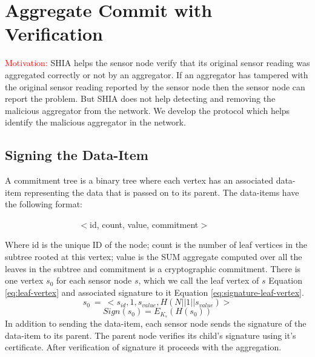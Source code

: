\chapter{Aggregate Commit with Verification} %
\label{cha:A Protocol for Commitment Tree Generation}
	
	\textcolor{red}{Motivation:}
	SHIA helps the sensor node verify that its original sensor reading was aggregated correctly or not by an aggregator.
	If an aggregator has tampered with the original sensor reading reported by the sensor node then the sensor node can report the problem.
	But SHIA does not help detecting and removing the malicious aggregator from the network.
	We develop the protocol which helps identify the malicious aggregator in the network.
	
\section{Signing the Data-Item}
	\begin{definition}
		\label{def:data-item}
		A commitment tree is a binary tree where each vertex has an associated data-item representing the data that is passed on to its parent. The data-items have the following format:

		$\hspace{100pt}$ $<$id, count, value, commitment$>$
	\end{definition}
	Where id is the unique ID of the node; count is the number of leaf vertices in the subtree rooted at this vertex; value is the SUM aggregate computed over all the leaves in the subtree and commitment is a cryptographic commitment.
	There is one vertex $s_{0}$ for each sensor node $s$, which we call the leaf vertex of $s$ Equation \ref{eq:leaf-vertex} and associated signature to it Equation \ref{eq:signature-leaf-vertex}.
	\begin{equation}
		\label{eq:leaf-vertex}
		s_{0}\ =\ <s_{id}, 1, s_{value}, H(N||1||s_{value})>
	\end{equation}
	\begin{equation}
		\label{eq:signature-leaf-vertex}
		Sign(s_{0}) = E_{K_{s}}(H(s_{0}))
	\end{equation}
	In addition to sending the data-item, each sensor node sends the signature of the data-item to its parent.
	The parent node verifies its child's signature using it's certificate.
	After verification of signature it proceeds with the aggregation.
	
